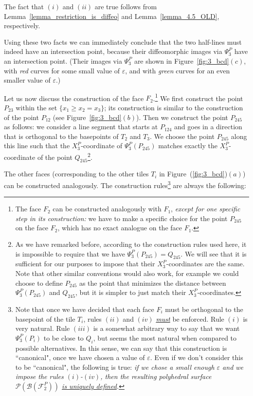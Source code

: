 \documentclass[12pt,letterpaper]{article}
\renewcommand{\P}{\mathcal{P}}
\newcommand{\B}{\mathcal{B}}
\begin{document}
\smallskip

The fact that $(i)$ and $(ii)$ are true follows from Lemma~\ref{lemma_restriction_is_diffeo} and Lemma~\ref{lemma_4.5_OLD}, respectively. 


\smallskip

Using these two facts we can immediately conclude that the two half-lines must indeed have an intersection point, because their diffeomorphic images via $\Psi_3^P$ have an intersection point. (Their images via $\Psi_3^P$ are shown in  Figure~\ref{fig:3_bcd}$(c)$, with {\em red} curves for some small value of $\varepsilon$, and with {\em green} curves for an even smaller value of $\varepsilon$.)




Let us now discuss the construction of the face $F_2$.\footnote{The face $F_2$ can be constructed analogously with $F_1$, {\em except for one specific step in its construction:} we have to make a specific choice for the point $P_{245}$ on the face $F_2$, which has no exact analogue on the face $F_1$.} 
We first construct the point $P_{23}$  within the set $\{x_1 \ge x_2 = x_3\}$; its construction is similar to the construction of the point $P_{12}$ (see Figure~\ref{fig:3_bcd}$(b)$). Then we construct the point $P_{245}$ as follows: we consider a line segment that starts at $P_{124}$ and goes in a direction that is orthogonal to the basepoints of $T_{2}$ and $T_{3}$. We choose the point $P_{245}$ along this line such that the $X_3^P$-coordinate of $\Psi_3^P(P_{245})$ matches exactly the $X_3^P$-coordinate of the point $Q_{245}$\footnote{As we have remarked before, according to the construction rules used here, it is impossible to require that we have $\Psi_3^P(P_{245}) = Q_{245}$. We will see that it is sufficient for our purposes to impose that their $X_3^P$-coordinates are the same. Note that other similar conventions would also work, for example we could choose to define $P_{245}$ as the point that minimizes the distance between $\Psi_3^P(P_{245})$ and $Q_{245}$, but it is simpler to just match their $X_3^P$-coordinates.}. 

The other faces (corresponding to the other tiles $T_i$ in Figure~(\ref{fig:3_bcd})$(a)$) can be constructed analogously. The construction rules\footnote{Note that once we have decided that each face $F_i$ must be orthogonal to the basepoint of the tile $T_i$, rules $(ii)$ and $(iv)$ \underline{\em must} be enforced. Rule $(i)$ is very natural. Rule $(iii)$ is a somewhat arbitrary way to say that we want $\Psi_3^P(P_{i})$ to be close to $Q_{i}$, but seems the most natural when compared to possible alternatives. In this sense, we can say that this construction is ``canonical", once we have chosen a value of $\varepsilon$. Even if we don't consider this to be ``canonical", the following is true: {\em if we chose a small enough $\varepsilon$ and we impose the rules $(i)$-$(iv)$, then the resulting polyhedral surface $\P(\B(\mathcal{F}_2^P))$  \underline{is uniquely defined}.}} are always the following: 
\end{document}
